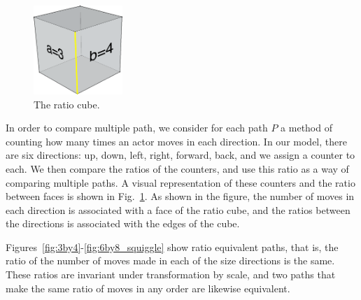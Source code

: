 \begin{figure}
  \centering
    \includegraphics[width=0.3\textwidth]{./figures/ratioCube_3_4}
      \caption{The ratio cube.}
      \label{fig:ratioCube}
\end{figure}
In order to compare multiple path, we consider for each path $P$ a method of counting how many times an actor moves in each direction.  
In our model, there are six directions: up, down, left, right, forward, back, and we assign a counter to each.
We then compare the ratios of the counters, and use this ratio as a way of comparing multiple paths.
A visual representation of these counters and the ratio between faces is shown in Fig.~\ref{fig:ratioCube}.
As shown in the figure, the number of moves in each direction is associated with a face of the ratio cube, and the ratios between the directions is associated with the edges of the cube.


Figures~\ref{fig:3by4}-\ref{fig:6by8_squiggle} show ratio equivalent paths, that is, the ratio of the number of moves made in each of the size directions is the same.
These ratios are invariant under transformation by scale, and two paths that make the same ratio of moves in any order are likewise equivalent.



